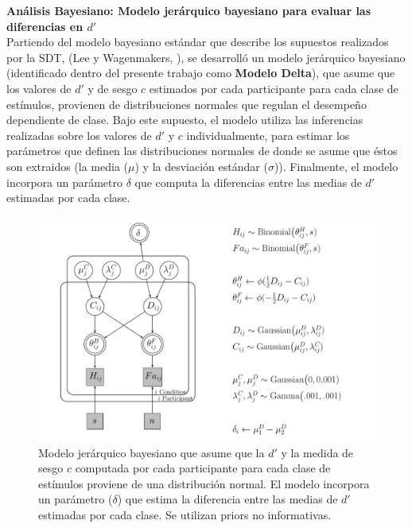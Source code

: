 \pagebreak
\textbf{Análisis Bayesiano: Modelo jerárquico bayesiano para evaluar las diferencias en $d'$}\\

Partiendo del modelo bayesiano estándar que describe los supuestos realizados por la SDT, (Lee y Wagenmakers, \citeyear{LeeBook}), se desarrolló un modelo jerárquico bayesiano (identificado dentro del presente trabajo como \textbf{Modelo Delta}), que asume que los valores de $d'$ y de sesgo $c$ estimados por cada participante para cada clase de estímulos, provienen de distribuciones normales que regulan el desempeño dependiente de clase. Bajo este supuesto, el modelo utiliza las inferencias realizadas sobre los valores de $d'$ y $c$ individualmente, para estimar los parámetros que definen las distribuciones normales de donde se asume que éstos son extraidos (la media ($\mu$) y la desviación estándar ($\sigma$)). Finalmente, el modelo incorpora un parámetro $\delta$ que computa la diferencias entre las medias de $d'$ estimadas por cada clase.\\

\begin{figure}[h]
\centering
\includegraphics[width=1\textwidth]{Figures/Model_Delta_Diff_D}
\decoRule
\caption[Modelo Delta: Modelo jerárquico bayesiano para evaluar las diferencias entre las medias de $d'$ de cada clase de estímulo]{Modelo jerárquico bayesiano que asume que la $d'$ y la medida de sesgo $c$ computada por cada participante para cada clase de estímulos proviene de una distribución normal. El modelo incorpora un parámetro ($\delta$) que estima la diferencia entre las medias de $d'$ estimadas por cada clase. Se utilizan priors no informativas.}
\label{fig:Mod_Delta}
\end{figure}

